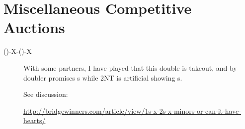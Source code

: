 \documentclass[tom-ari]{subfile}
\begin{document}
     \section{Miscellaneous Competitive Auctions}
     \begin{description}
         \item[()-X-()-X] With some partners, I have played that this double is takeout, and  by doubler promises s while 2NT is artificial showing s. 
         
         See discussion: 
         
         \url{http://bridgewinners.com/article/view/1s-x-2s-x-minors-or-can-it-have-hearts/}
          
     \end{description}
	
\end{document}

